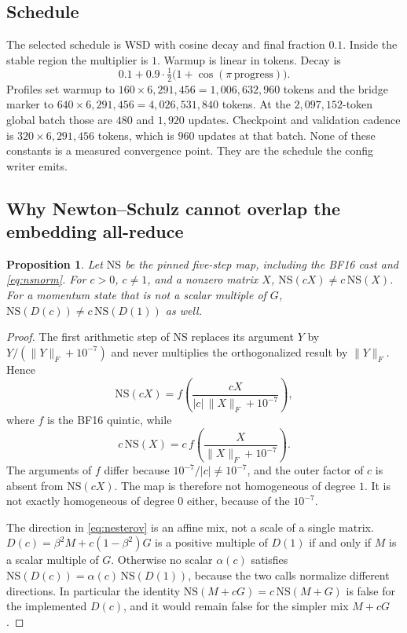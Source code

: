 \documentclass[11pt]{article}
\newtheorem{proposition}{Proposition}
\begin{document}
\subsection{Schedule}

The selected schedule is WSD with cosine decay and final fraction \(0.1\).
Inside the stable region the multiplier is \(1\). Warmup is linear in tokens.
Decay is
\begin{equation}
0.1 + 0.9\cdot \tfrac12\bigl(1+\cos(\pi\,\mathrm{progress})\bigr).
\end{equation}
Profiles set warmup to \(160\times 6{,}291{,}456=1{,}006{,}632{,}960\) tokens
and the bridge marker to \(640\times 6{,}291{,}456=4{,}026{,}531{,}840\)
tokens. At the \(2{,}097{,}152\)-token global batch those are \(480\) and
\(1{,}920\) updates. Checkpoint and validation cadence is
\(320\times 6{,}291{,}456\) tokens, which is \(960\) updates at that batch.
None of these constants is a measured convergence point. They are the
schedule the config writer emits.

\subsection{Why Newton--Schulz cannot overlap the embedding all-reduce}

\begin{proposition}
Let \(\mathrm{NS}\) be the pinned five-step map, including the BF16 cast and
\eqref{eq:nsnorm}. For \(c>0\), \(c\neq 1\), and a nonzero matrix \(X\),
\(\mathrm{NS}(cX)\neq c\,\mathrm{NS}(X)\). For a momentum state that is not a
scalar multiple of \(G\), \(\mathrm{NS}(D(c))\neq c\,\mathrm{NS}(D(1))\) as
well.
\end{proposition}

\begin{proof}
The first arithmetic step of \(\mathrm{NS}\) replaces its argument \(Y\) by
\(Y/(\|Y\|_F+10^{-7})\) and never multiplies the orthogonalized result by
\(\|Y\|_F\). Hence
\begin{equation}
\mathrm{NS}(cX)
 =
 f\!\left(\frac{cX}{|c|\,\|X\|_F+10^{-7}}\right),
\end{equation}
where \(f\) is the BF16 quintic, while
\begin{equation}
c\,\mathrm{NS}(X)
 =
 c\,f\!\left(\frac{X}{\|X\|_F+10^{-7}}\right).
\end{equation}
The arguments of \(f\) differ because \(10^{-7}/|c|\neq 10^{-7}\), and the
outer factor of \(c\) is absent from \(\mathrm{NS}(cX)\). The map is
therefore not homogeneous of degree \(1\). It is not exactly homogeneous of
degree \(0\) either, because of the \(10^{-7}\).

The direction in \eqref{eq:nesterov} is an affine mix, not a scale of a
single matrix. \(D(c)=\beta^{2}M+c(1-\beta^{2})G\) is a positive multiple of
\(D(1)\) if and only if \(M\) is a scalar multiple of \(G\). Otherwise no
scalar \(\alpha(c)\) satisfies \(\mathrm{NS}(D(c))=\alpha(c)\,\mathrm{NS}(D(1))\),
because the two calls normalize different directions. In particular the
identity \(\mathrm{NS}(M+cG)=c\,\mathrm{NS}(M+G)\) is false for the
implemented \(D(c)\), and it would remain false for the simpler mix \(M+cG\).
\end{proof}
\end{document}
